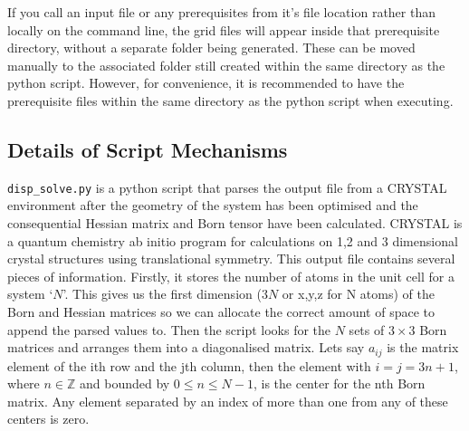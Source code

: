 \documentclass[10pt]{article}
\begin{document}
If you call an input file or any prerequisites from it's file location rather than locally on the command line, the grid files will appear inside that prerequisite directory, without a separate folder being generated. These can be moved manually to the associated folder still created within the same directory as the python script. However, for convenience, it is recommended to have the prerequisite files within the same directory as the python script when executing.

\subsection{Details of Script Mechanisms}

\texttt{disp\_solve.py} is a python script that parses the output file from a CRYSTAL environment after the geometry of the system has been optimised and the consequential Hessian matrix and Born tensor have been calculated. CRYSTAL is a quantum chemistry ab initio program for calculations on 1,2 and 3 dimensional crystal structures using translational symmetry. This output file contains several pieces of information. Firstly, it stores the number of atoms in the unit cell for a system `$N$'. This gives us the first dimension ($3N$ or x,y,z for N atoms) of the Born and Hessian matrices so we can allocate the correct amount of space to append the parsed values to. Then the script looks for the $N$ sets of $3\times3$ Born matrices and arranges them into a diagonalised matrix. Lets say $a_{ij}$ is the matrix element of the ith row and the jth column, then the element with $i = j = 3n+1$, where $n \in \mathbb{Z}$ and bounded by $0 \leq n \leq N-1$, is the center for the nth Born matrix. Any element separated by an index of more than one from any of these centers is zero.
\end{document}
